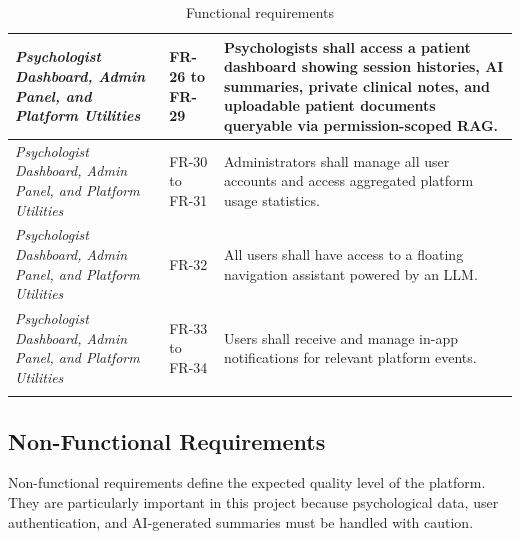 \documentclass[a4paper,12pt]{report}
\begin{document}
\begin{longtable}{@{} L{0.24\textwidth} L{0.14\textwidth} L{0.54\textwidth} @{}}
\midrule
\emph{Psychologist Dashboard, Admin Panel, and Platform Utilities} & FR-26 to FR-29 & Psychologists shall access a patient dashboard showing session histories, AI summaries, private clinical notes, and uploadable patient documents queryable via permission-scoped RAG. \\
\midrule
\emph{Psychologist Dashboard, Admin Panel, and Platform Utilities} & FR-30 to FR-31 & Administrators shall manage all user accounts and access aggregated platform usage statistics. \\
\midrule
\emph{Psychologist Dashboard, Admin Panel, and Platform Utilities} & FR-32 & All users shall have access to a floating navigation assistant powered by an LLM. \\
\midrule
\emph{Psychologist Dashboard, Admin Panel, and Platform Utilities} & FR-33 to FR-34 & Users shall receive and manage in-app notifications for relevant platform events. \\
\bottomrule
\caption{Functional requirements}
\label{tab:functional-requirements}\\
\end{longtable}

\subsection{Non-Functional Requirements}

Non-functional requirements define the expected quality level of the platform. They are particularly important in this project because psychological data, user authentication, and AI-generated summaries must be handled with caution.

\vspace{1cm}
\end{document}
